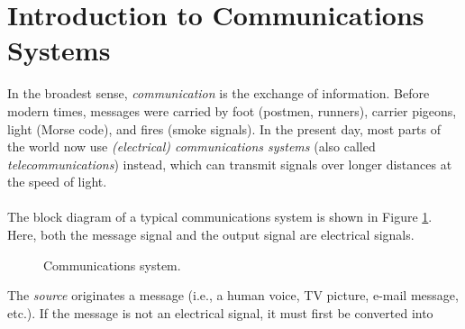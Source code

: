 \documentclass{report}
\begin{document}
\section{Introduction to Communications Systems}
In the broadest sense, \emph{communication} is the exchange of information. Before modern times, messages were carried by foot (postmen, runners), carrier pigeons, light (Morse code), and fires (smoke signals). 
In the present day, most parts of the world now use \emph{(electrical) communications systems} (also called \emph{telecommunications}) instead, which can transmit signals over longer distances at the speed of light.
\\ \\
The block diagram of a typical communications system is shown in Figure \ref{comms}. Here, both the message signal and the output signal are electrical signals. 
\begin{figure}[!hbt]
    \caption{Communications system.}
    \label{comms}
    \centering
\end{figure}
The \emph{source} originates a message (i.e., a human voice, TV picture, e-mail message, etc.). If the message is not an electrical signal, it must first be converted into 
\end{document}
